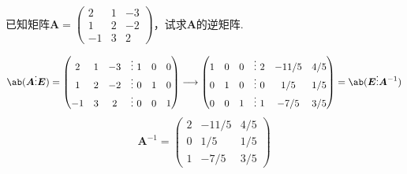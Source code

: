 \begin{exercise}
    已知矩阵$\boldsymbol{A}=
    \begin{pmatrix}
        2 & 1 & -3\\
        1 & 2 & -2\\
        -1 & 3 & 2
    \end{pmatrix}
    $，试求$\boldsymbol{A}$的逆矩阵.
\end{exercise}
\begin{solution}
    $$\ab(\boldsymbol{A}\vdots\boldsymbol{E})=
    \begin{pmatrix}
        2 & 1 & -3 &\vdots\ 1 & 0 & 0\\
        1 & 2 & -2 &\vdots\ 0 & 1 & 0\\
        -1 & 3 & 2 &\vdots\ 0 & 0 & 1
    \end{pmatrix}\longrightarrow
    \begin{pmatrix}
        1 & 0 & 0 &\vdots\ 2 & -11/5 & 4/5\\
        0 & 1 & 0 &\vdots\ 0 & 1/5 & 1/5\\
        0 & 0 & 1 &\vdots\ 1 & -7/5 & 3/5
    \end{pmatrix}=\ab(\boldsymbol{E}\vdots\boldsymbol{A}^{-1})
    $$
    $$\boldsymbol{A}^{-1}=
    \begin{pmatrix}
    2 & -11/5 & 4/5\\
    0 & 1/5 & 1/5\\
    1 & -7/5 & 3/5
    \end{pmatrix}
    $$
\end{solution}
